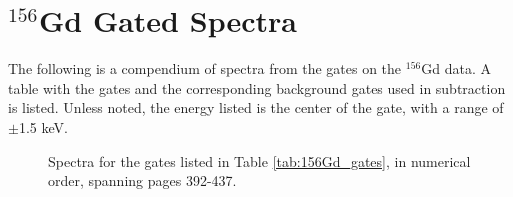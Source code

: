 \chapter{$^{156}$Gd Gated Spectra}
\label{chap:156_spectra}

The following is a compendium of spectra from the gates on the $^{156}$Gd data. A table with the gates and the corresponding background gates used in subtraction is listed. Unless noted, the energy listed is the center of the gate, with a range of $\pm$1.5 keV.



\pagebreak

\begin{figure}
    \caption{Spectra for the gates listed in Table \ref{tab:156Gd_gates}, in numerical order, spanning pages 392-437.}
    \label{fig:156_App}
\end{figure}

\pagebreak


